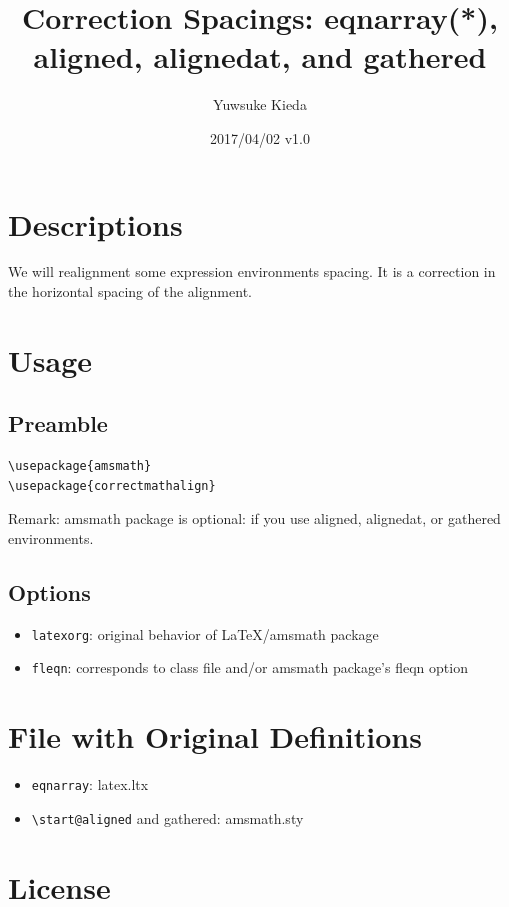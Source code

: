 \documentclass{article}
\title{Correction Spacings: eqnarray(*), aligned, alignedat, and gathered}
\author{Yuwsuke Kieda}
\date{2017/04/02 v1.0}
\begin{document}
\maketitle

\section{Descriptions}

We will realignment some expression environments spacing.
It is a correction in the horizontal spacing of the alignment.

\section{Usage}

\subsection{Preamble}

\begin{verbatim}
\usepackage{amsmath}
\usepackage{correctmathalign}
\end{verbatim}

Remark: amsmath package is optional: if you use aligned, alignedat, or gathered environments.

\subsection{Options}

\begin{itemize}
 \item \verb!latexorg!: original behavior of LaTeX/amsmath package
 \item \verb!fleqn!: corresponds to class file and/or amsmath package's fleqn option
\end{itemize}

\section{File with Original Definitions}

\begin{itemize}
 \item \verb!eqnarray!: latex.ltx
 \item \verb!\start@aligned! and gathered: amsmath.sty
\end{itemize}

\section{License}
\end{document}
